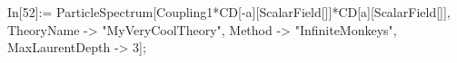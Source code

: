 In[52]:= ParticleSpectrum[Coupling1*CD[-a][ScalarField[]]*CD[a][ScalarField[]], TheoryName -> "MyVeryCoolTheory", Method -> "InfiniteMonkeys", MaxLaurentDepth -> 3]; 
